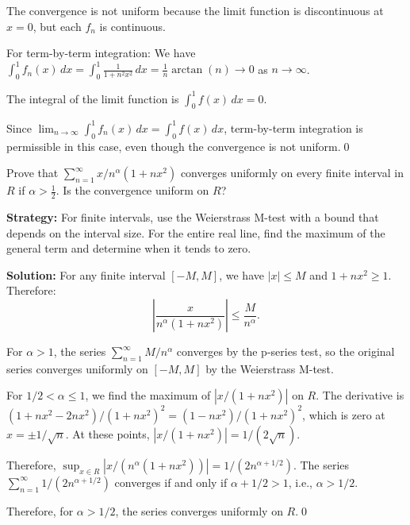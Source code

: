 The convergence is not uniform because the limit function is discontinuous at \( x = 0 \), but each \( f_n \) is continuous.

For term-by-term integration: We have \( \int_0^1 f_n(x) \, dx = \int_0^1 \frac{1}{1 + n^2x^2} \, dx = \frac{1}{n} \arctan(n) \to 0 \) as \( n \to \infty \).

The integral of the limit function is \( \int_0^1 f(x) \, dx = 0 \).

Since \( \lim_{n \to \infty} \int_0^1 f_n(x) \, dx = \int_0^1 f(x) \, dx \), term-by-term integration is permissible in this case, even though the convergence is not uniform.\qed


\begin{problembox}
\begin{problemstatement}
Prove that \(\sum_{n=1}^{\infty} x/n^\alpha (1 + nx^2)\) converges uniformly on every finite interval in \( R \) if \( \alpha > \frac{1}{2} \). Is the convergence uniform on \( R \)?
\end{problemstatement}
\end{problembox}

\noindent\textbf{Strategy:} For finite intervals, use the Weierstrass M-test with a bound that depends on the interval size. For the entire real line, find the maximum of the general term and determine when it tends to zero.

\bigskip\noindent\textbf{Solution:} For any finite interval \([-M, M]\), we have \( |x| \leq M \) and \( 1 + nx^2 \geq 1 \). Therefore:
\[\left|\frac{x}{n^\alpha (1 + nx^2)}\right| \leq \frac{M}{n^\alpha}.\]

For \( \alpha > 1 \), the series \( \sum_{n=1}^{\infty} M/n^\alpha \) converges by the p-series test, so the original series converges uniformly on \([-M, M]\) by the Weierstrass M-test.

For \( 1/2 < \alpha \leq 1 \), we find the maximum of \( |x/(1 + nx^2)| \) on \( R \). The derivative is \( (1 + nx^2 - 2nx^2)/(1 + nx^2)^2 = (1 - nx^2)/(1 + nx^2)^2 \), which is zero at \( x = \pm 1/\sqrt{n} \). At these points, \( |x/(1 + nx^2)| = 1/(2\sqrt{n}) \).

Therefore, \( \sup_{x \in R} |x/(n^\alpha (1 + nx^2))| = 1/(2n^{\alpha + 1/2}) \). The series \( \sum_{n=1}^{\infty} 1/(2n^{\alpha + 1/2}) \) converges if and only if \( \alpha + 1/2 > 1 \), i.e., \( \alpha > 1/2 \).

Therefore, for \( \alpha > 1/2 \), the series converges uniformly on \( R \).\qed


